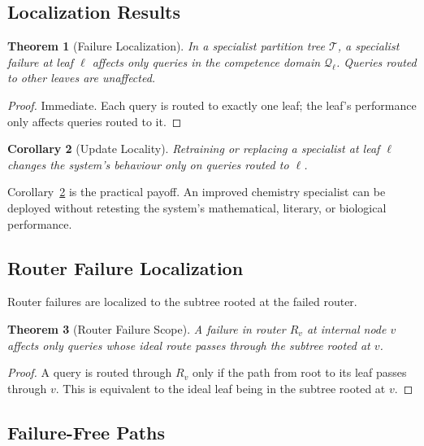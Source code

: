 \documentclass[11pt,twocolumn,a4paper]{article}
\newtheorem{theorem}{Theorem}[section]
\newtheorem{corollary}[theorem]{Corollary}
\theoremstyle{definition}
\theoremstyle{remark}
\newcommand{\Tc}{\mathcal{T}}
\begin{document}
\subsection{Localization Results}

\begin{theorem}[Failure Localization]
\label{thm:fail-localize}
In a specialist partition tree $\Tc$, a specialist failure at leaf $\ell$ affects only queries in the competence domain $\mathcal{Q}_\ell$. Queries routed to other leaves are unaffected.
\end{theorem}

\begin{proof}
Immediate. Each query is routed to exactly one leaf; the leaf's performance only affects queries routed to it.
\end{proof}

\begin{corollary}[Update Locality]
\label{cor:update}
Retraining or replacing a specialist at leaf $\ell$ changes the system's behaviour only on queries routed to $\ell$.
\end{corollary}

Corollary~\ref{cor:update} is the practical payoff. An improved chemistry specialist can be deployed without retesting the system's mathematical, literary, or biological performance.

\subsection{Router Failure Localization}

Router failures are localized to the subtree rooted at the failed router.

\begin{theorem}[Router Failure Scope]
\label{thm:router-fail}
A failure in router $R_v$ at internal node $v$ affects only queries whose ideal route passes through the subtree rooted at $v$.
\end{theorem}

\begin{proof}
A query is routed through $R_v$ only if the path from root to its leaf passes through $v$. This is equivalent to the ideal leaf being in the subtree rooted at $v$.
\end{proof}

\subsection{Failure-Free Paths}
\end{document}
